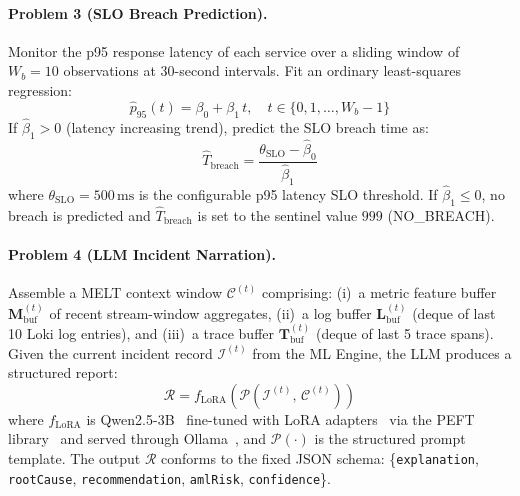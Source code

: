 \documentclass[a4paper,anonymous,UKenglish]{lipics-v2021}
\begin{document}
\paragraph*{Problem 3 (SLO Breach Prediction).}
Monitor the p95 response latency of each service over a sliding window of
$W_b{=}10$ observations at 30-second intervals. Fit an ordinary least-squares
regression:
\begin{equation}
    \hat{p}_{95}(t) = \beta_0 + \beta_1\,t, \quad t \in \{0,1,\ldots,W_b{-}1\}
    \label{eq:breach}
\end{equation}
If $\hat{\beta}_1 > 0$ (latency increasing trend), predict the SLO breach
time as:
\begin{equation}
    \hat{T}_{\text{breach}} = \frac{\theta_{\text{SLO}} -
    \hat{\beta}_0}{\hat{\beta}_1}
    \label{eq:eta}
\end{equation}
where $\theta_{\text{SLO}} = 500\,\text{ms}$ is the configurable p95 latency
SLO threshold. If $\hat{\beta}_1 \leq 0$, no breach is predicted and
$\hat{T}_{\text{breach}}$ is set to the sentinel value $999$ (NO\_BREACH).

\paragraph*{Problem 4 (LLM Incident Narration).}
Assemble a MELT context window $\mathcal{C}^{(t)}$ comprising:
(i)~a metric feature buffer $\mathbf{M}_{\text{buf}}^{(t)}$ of recent
stream-window aggregates, (ii)~a log buffer $\mathbf{L}_{\text{buf}}^{(t)}$
(deque of last 10 Loki log entries), and (iii)~a trace buffer
$\mathbf{T}_{\text{buf}}^{(t)}$ (deque of last 5 trace spans). Given the
current incident record $\mathcal{I}^{(t)}$ from the ML Engine, the LLM
produces a structured report:
\begin{equation}
    \mathcal{R} = f_{\text{LoRA}}\!\left(\mathcal{P}\!\left(\mathcal{I}^{(t)},\,
    \mathcal{C}^{(t)}\right)\right)
    \label{eq:llm}
\end{equation}
where $f_{\text{LoRA}}$ is Qwen2.5-3B~\cite{qwen2024} fine-tuned with LoRA
adapters~\cite{hu2022lora} via the PEFT library~\cite{peft2022} and served
through Ollama~\cite{ollama2023}, and $\mathcal{P}(\cdot)$ is the structured
prompt template. The output $\mathcal{R}$ conforms to the fixed JSON schema:
\{\texttt{explanation}, \texttt{rootCause}, \texttt{recommendation},
\texttt{amlRisk}, \texttt{confidence}\}.
\end{document}
